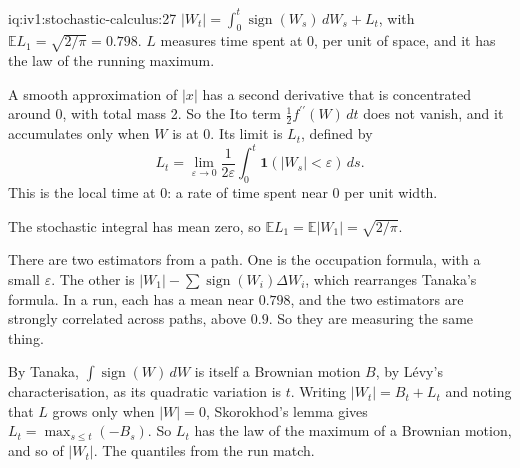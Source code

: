 \begin{solution}{iq:iv1:stochastic-calculus:27}
$|W_t| = \int_0^t\operatorname{sign}(W_s)\,dW_s + L_t$, with $\mathbb{E}L_1 = \sqrt{2/\pi} = 0.798$. $L$ measures time spent at 0, per unit of space, and it has the law of the running maximum.

A smooth approximation of $|x|$ has a second derivative that is concentrated around 0, with total mass 2. So the Ito term $\frac12f^{\prime\prime}(W)\,dt$ does not vanish, and it accumulates only when $W$ is at 0. Its limit is $L_t$, defined by
\[
L_t = \lim_{\varepsilon \to 0}\frac{1}{2\varepsilon}\int_0^t\mathbf{1}(|W_s| < \varepsilon)\,ds.
\]
This is the local time at 0: a rate of time spent near 0 per unit width.

The stochastic integral has mean zero, so $\mathbb{E}L_1 = \mathbb{E}|W_1| = \sqrt{2/\pi}$.

There are two estimators from a path. One is the occupation formula, with a small $\varepsilon$. The other is $|W_1| - \sum\operatorname{sign}(W_{i})\Delta W_i$, which rearranges Tanaka's formula. In a run, each has a mean near $0.798$, and the two estimators are strongly correlated across paths, above $0.9$. So they are measuring the same thing.

By Tanaka, $\int\operatorname{sign}(W)\,dW$ is itself a Brownian motion $B$, by L\'evy's characterisation, as its quadratic variation is $t$. Writing $|W_t| = B_t + L_t$ and noting that $L$ grows only when $|W| = 0$, Skorokhod's lemma gives $L_t = \max_{s \le t}(-B_s)$. So $L_t$ has the law of the maximum of a Brownian motion, and so of $|W_t|$. The quantiles from the run match.



\end{solution}

